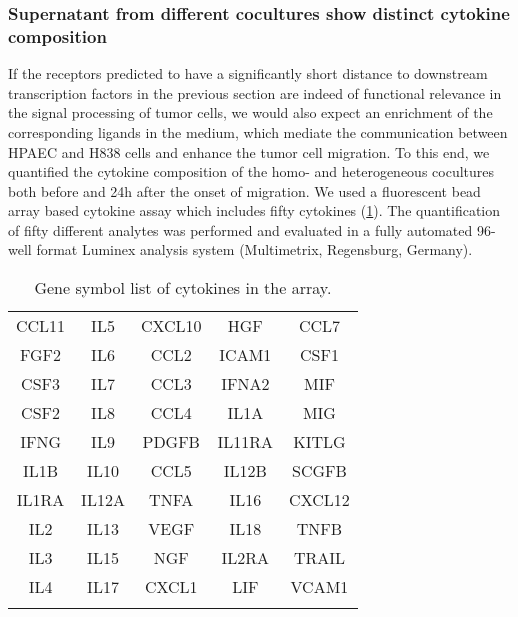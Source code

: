\subsubsection{Supernatant  from different cocultures show distinct cytokine composition}

If the receptors predicted to have a significantly short
distance to downstream transcription factors in the previous section are indeed of functional
relevance in the signal processing of tumor cells, we would also expect an
enrichment of the corresponding ligands in the medium,
which mediate the communication between
HPAEC and H838 cells and enhance the tumor cell migration.
To this end, we quantified the cytokine composition
of the  homo- and heterogeneous cocultures
both before and 24h after the onset of migration.
We used a  fluorescent bead array based cytokine assay which includes fifty cytokines (\ref{table:cytokine}).
The quantification of fifty different analytes was performed and evaluated in a  fully automated 96-well format Luminex analysis system (Multimetrix, Regensburg,  Germany). 

\clearpage
\begin{longtable}{ccccc}
\caption{Gene symbol list of cytokines in the array.} \\ 
\hline
CCL11 & IL5 &   CXCL10 &  HGF & CCL7\\
\rowcolor{Gray} FGF2 &  IL6 &   CCL2 &  ICAM1 & CSF1\\
CSF3 &  IL7 &   CCL3 & IFNA2 & MIF\\
\rowcolor{Gray} CSF2 & IL8 &   CCL4 &  IL1A & MIG\\
IFNG &  IL9&    PDGFB&  IL11RA & KITLG\\
\rowcolor{Gray} IL1B &  IL10 &  CCL5 & IL12B  & SCGFB\\
IL1RA &  IL12A  &  TNFA &   IL16 &  CXCL12\\
\rowcolor{Gray} IL2 &   IL13 &  VEGF &   IL18 &  TNFB\\
IL3 &   IL15 &  NGF&  IL2RA &   TRAIL\\
\rowcolor{Gray} IL4 &   IL17 &  CXCL1 &  LIF &VCAM1\\
\hline
\label{table:cytokine}
\end{longtable}
\newpage

